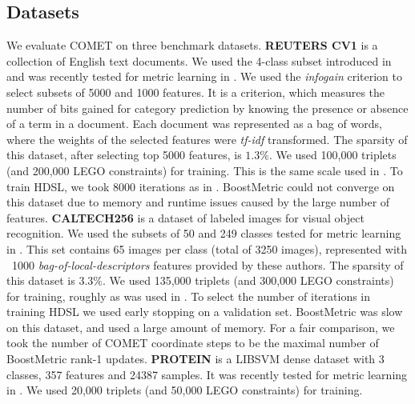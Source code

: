 \documentclass[twoside,11pt]{article}
\begin{document}
\subsection{Datasets}\vskip -5pt
We evaluate COMET on three benchmark datasets.
\textbf{REUTERS CV1} is a collection of English text documents. We used the 4-class subset introduced in \citep{CaiRCV14} and was recently tested for metric learning in \citep{HDSL}. We used the \textit{infogain} criterion \citep{infogain} to select subsets of 5000 and 1000 features. It is a criterion, which measures the number of bits gained for category prediction by knowing the presence or absence of a term in a document. Each document was represented as a bag of words, where the weights of the selected features were \textit{tf-idf} transformed. The sparsity of this dataset, after selecting top 5000 features, is $1.3\%$. We used 100,000 triplets (and 200,000 LEGO constraints) for training. This is the same scale used in \citet{HDSL}. To train HDSL, we took 8000 iterations as in \citep{HDSL}. BoostMetric could not converge on this dataset due to memory and runtime issues caused by the large number of features. \textbf{CALTECH256} is a dataset of labeled images for visual object recognition. We used the subsets of 50 and 249 classes tested for metric learning in \citep{OASIS}. This set contains 65 images per class (total of 3250 images), represented with ~1000 \textit{bag-of-local-descriptors} features provided by these authors. The sparsity of this dataset is $3.3\%$. We used 135,000 triplets (and 300,000 LEGO constraints) for training, roughly as was used in \citep{OASIS}. To select the number of iterations in training HDSL we used early stopping on a validation set. BoostMetric was slow on this dataset, and used a large amount of memory. For a fair comparison, we took the number of COMET coordinate steps to be the maximal number of BoostMetric rank-1 updates. \textbf{PROTEIN} is a LIBSVM \citep{libsvm} dense dataset with 3 classes, 357 features and 24387 samples. It was recently tested for metric learning in \citep{qian}. We used 20,000 triplets (and 50,000 LEGO constraints) for training.
\end{document}
